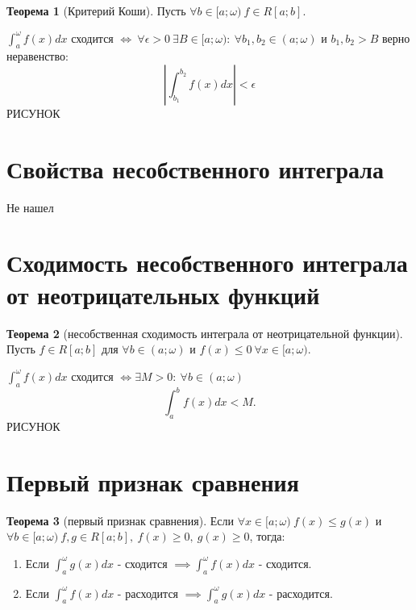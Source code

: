 \documentclass{report}
\theoremstyle{definition}
\newtheorem*{theorem}{Теорема}
\begin{document}
\begin{theorem}[Критерий Коши]
    Пусть $\forall b \in [a;\omega) \ f\in R[a;b]$.

    $\int_{a}^{\omega}f(x)dx$ сходится $\iff \ \forall
        \epsilon > 0 \ \exists B\in [a;\omega): \ \forall b_1,b_2 \in (a;\omega)$ и $b_1,b_2 > B$ верно неравенство:
    \begin{equation*}
        | \int_{b_1}^{b_2}f(x)dx | < \epsilon
    \end{equation*}
    {\Large РИСУНОК}
\end{theorem}

\section{Свойства несобственного интеграла}

Не нашел

\section{Сходимость несобственного интеграла от неотрицательных функций}

\begin{theorem}[несобственная сходимость интеграла от неотрицательной функции]
    Пусть $f\in R[a;b]$ для $\forall b \in (a;\omega)$ и $f(x)\leqslant 0 \ \forall x \in [a;\omega).$

    $\int_{a}^{\omega}f(x)dx$ сходится $\iff \exists M > 0: \ \forall b \in (a;\omega)$
    \begin{equation*}
        \int_{a}^{b}f(x)dx < M.
    \end{equation*}
    {\Large РИСУНОК}
\end{theorem}

\section{Первый признак сравнения}

\begin{theorem}[первый признак сравнения]
    Если $\forall x \in [a;\omega) \ f(x) \leqslant g(x)$ и $\forall b \in [a;\omega) \ f,g \in R[a;b], \
        f(x) \geqslant 0, \ g(x) \geqslant 0$, тогда:
    \begin{enumerate}
        \item Если $\int_{a}^{\omega}g(x)dx$ - сходится $\implies \int_{a}^{\omega}f(x)dx$ - сходится.
        \item Если $\int_{a}^{\omega}f(x)dx$ - расходится $\implies \int_{a}^{\omega}g(x)dx$ - расходится.
    \end{enumerate}
\end{theorem}
\end{document}

